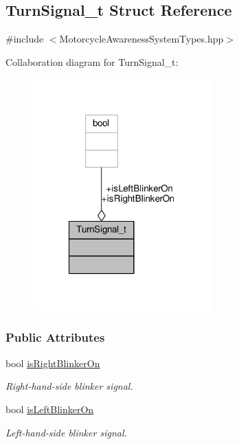 \hypertarget{structTurnSignal__t}{\subsection{Turn\-Signal\-\_\-t Struct Reference}
\label{structTurnSignal__t}
}


{\ttfamily \#include $<$Motorcycle\-Awareness\-System\-Types.\-hpp$>$}



Collaboration diagram for Turn\-Signal\-\_\-t\-:\nopagebreak
\begin{figure}[H]
\begin{center}
\leavevmode
\includegraphics[width=195pt]{structTurnSignal__t__coll__graph}
\end{center}
\end{figure}
\subsubsection*{Public Attributes}
\begin{DoxyCompactItemize}
\item 
bool \hyperlink{structTurnSignal__t_a5b777c664220a398686d3a38661b4181}{is\-Right\-Blinker\-On}
\begin{DoxyCompactList}\small\item\em Right-\/hand-\/side blinker signal. \end{DoxyCompactList}\item 
bool \hyperlink{structTurnSignal__t_a7346ca64038ffb9b16cf2b22690dcae6}{is\-Left\-Blinker\-On}
\begin{DoxyCompactList}\small\item\em Left-\/hand-\/side blinker signal. \end{DoxyCompactList}\end{DoxyCompactItemize}


